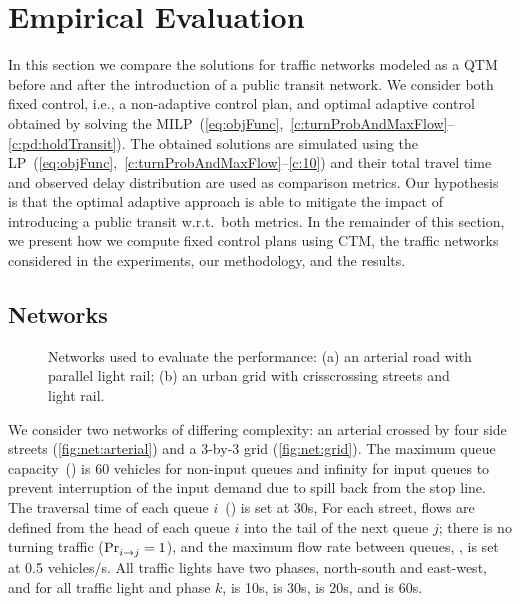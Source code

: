 \section{Empirical Evaluation}
  
In this section we compare the solutions for traffic networks modeled as a QTM
before and after the introduction of a public transit network.
%
We consider both fixed control, i.e., a non-adaptive control plan, and optimal
adaptive control obtained by solving the
MILP~(\ref{eq:objFunc},~\ref{c:turnProbAndMaxFlow}--\ref{c:pd:holdTransit}).
%
The obtained solutions are simulated using the
LP~(\ref{eq:objFunc},~\ref{c:turnProbAndMaxFlow}--\ref{c:10}) and their total
travel time and observed delay distribution are used as comparison metrics.
%
Our hypothesis is that the optimal adaptive approach is able to mitigate the
impact of introducing a public transit w.r.t.\ both metrics.
%
In the remainder of this section, we present how we compute fixed control plans
using CTM, the traffic networks considered in the experiments, our methodology,
and the results.






\subsection{Networks}

\begin{figure}[t!]
\centering
\caption{Networks used to evaluate the performance:
  (a) an arterial road with parallel light rail;
  (b) an urban grid with crisscrossing streets and light
  rail.
%
}
\label{fig:networks}
\end{figure}



We consider two networks of differing complexity: an arterial crossed by four
side streets (\cref{fig:net:arterial}) and a 3-by-3 grid (\cref{fig:net:grid}).
%
%
The maximum queue capacity~() is 60 vehicles for non-input queues and
infinity for input queues to prevent interruption of the input demand due to
spill back from the stop line. 
%
The traversal time of each queue $i$~() is set at 30s,
%
For each street, flows are defined from the head of each queue $i$ into the tail
of the next queue $j$;
%
there is no turning traffic ($\mathrm{Pr}_{i\to j}^{\mathrm{}}=1$), and the maximum flow rate
between queues, , is set at 0.5 vehicles/s.
%
All traffic lights have two phases, north-south and east-west, and for all
traffic light \tl and phase $k$,  is 10s,  is 30s,
\CTMIN{\tl} is 20s, and \CTMAX{\tl} is 60s.


